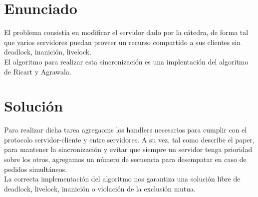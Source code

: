 \section{Enunciado}

El problema consistía en modificar el servidor dado por la cátedra, de forma tal que varios servidores puedan proveer un recurso compartido a sus clientes
sin deadlock, inanición, livelock.\\
El algoritmo para realizar esta sincronización es una implentación del algoritmo de Ricart y Agrawala.

\section{Solución}

Para realizar dicha tarea agregaoms los handlers necesarios para cumplir con el protocolo servidor-cliente y entre servidores.
A su vez, tal como describe el paper, para mantener la sincronización y evitar que siempre un servidor tenga prioridad sobre los otros, agregamos
un número de secuencia para desempatar en caso de pedidos simultáneos.\\
La correcta implementación del algoritmo nos garantiza una solución libre de deadlock, livelock,
inanición o violación de la exclusión mutua.

